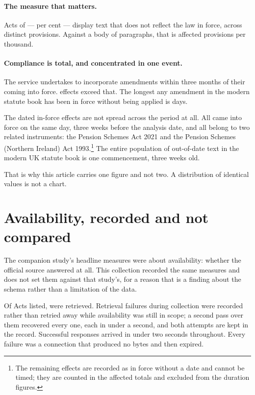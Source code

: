 \documentclass[11pt]{article}
\begin{document}
\paragraph{The measure that matters.} \nActsAffected{} Acts of \nActsRetrieved{}
--- \nActsAffectedShare{} per cent --- display text that does not reflect the
law in force, across \nProvisions{} distinct provisions. Against a body of
\nBodyParagraphs{} paragraphs, that is \nProvisionsPerThousand{} affected
provisions per thousand.

\paragraph{Compliance is total, and concentrated in one event.} The service
undertakes to incorporate amendments within three months of their coming into
force. \nBeyondTarget{} effects exceed that. The longest any amendment in the
modern statute book has been in force without being applied is \nLongestDays{}
days.

The dated in-force effects are not spread across the period at all. All
\nInForceNow{} came into force on the same day, three weeks before the analysis
date, and all belong to two related instruments: the Pension Schemes Act 2021
and the Pension Schemes (Northern Ireland) Act 1993.\footnote{The remaining
\nInForceUndated{} effects are recorded as in force without a date and cannot be
timed; they are counted in the affected totals and excluded from the duration
figures.} The entire population of out-of-date text in the modern UK statute
book is one commencement, three weeks old.

That is why this article carries one figure and not two. A distribution of
\nInForceNow{} identical values is not a chart.

\section{Availability, recorded and not compared}

The companion study's headline measures were about availability: whether the
official source answered at all. This collection recorded the same measures and
does not set them against that study's, for a reason that is a finding about
the schema rather than a limitation of the data.

Of \nActsListed{} Acts listed, \nActsRetrieved{} were retrieved. Retrieval
failures during collection were recorded rather than retried away while
availability was still in scope; a second pass over them recovered every one,
each in under a second, and both attempts are kept in the record. Successful
responses arrived in under two seconds throughout. Every failure was a
connection that produced no bytes and then expired.
\end{document}
